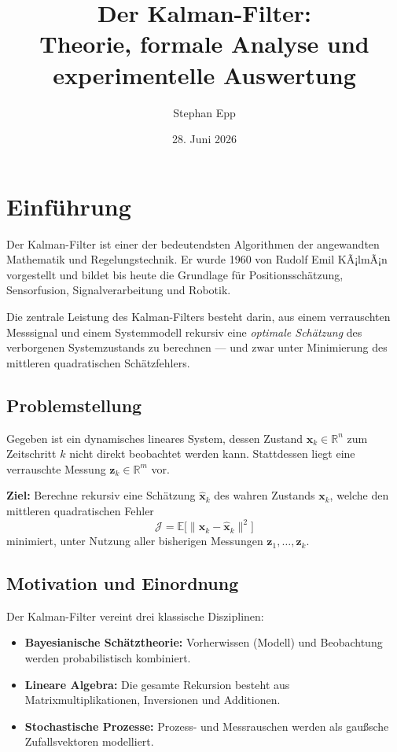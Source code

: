 ﻿\documentclass[a4paper,12pt]{article}
\title{Der Kalman-Filter:\\
\large Theorie, formale Analyse und experimentelle Auswertung}
\author{Stephan Epp}
\date{28. Juni 2026}
\theoremstyle{definition}
\begin{document}
\maketitle

\tableofcontents
\newpage

\section{Einführung}

Der Kalman-Filter ist einer der bedeutendsten Algorithmen der angewandten Mathematik und Regelungstechnik.
Er wurde 1960 von Rudolf Emil KÃ¡lmÃ¡n vorgestellt \cite{kalman1960} und bildet bis heute die
Grundlage für Positionsschätzung, Sensorfusion, Signalverarbeitung und Robotik.

Die zentrale Leistung des Kalman-Filters besteht darin, aus einem verrauschten Messsignal
und einem Systemmodell rekursiv eine \emph{optimale Schätzung} des verborgenen Systemzustands zu
berechnen --- und zwar unter Minimierung des mittleren quadratischen Schätzfehlers.

\subsection{Problemstellung}

Gegeben ist ein dynamisches lineares System, dessen Zustand $\mathbf{x}_k \in \mathbb{R}^n$ zum
Zeitschritt $k$ nicht direkt beobachtet werden kann. Stattdessen liegt eine
verrauschte Messung $\mathbf{z}_k \in \mathbb{R}^m$ vor.

\textbf{Ziel:} Berechne rekursiv eine Schätzung $\hat{\mathbf{x}}_k$ des wahren Zustands
$\mathbf{x}_k$, welche den mittleren quadratischen Fehler
\[
    \mathcal{J} = \mathbb{E}\bigl[\|\mathbf{x}_k - \hat{\mathbf{x}}_k\|^2\bigr]
\]
minimiert, unter Nutzung aller bisherigen Messungen $\mathbf{z}_1, \ldots, \mathbf{z}_k$.

\subsection{Motivation und Einordnung}

Der Kalman-Filter vereint drei klassische Disziplinen:
\begin{itemize}
    \item \textbf{Bayesianische Schätztheorie:} Vorherwissen (Modell) und Beobachtung
          werden probabilistisch kombiniert.
    \item \textbf{Lineare Algebra:} Die gesamte Rekursion besteht aus Matrix\-multiplikationen,
          Inversionen und Additionen.
    \item \textbf{Stochastische Prozesse:} Prozess- und Messrauschen werden als
          gaußsche Zufallsvektoren modelliert.
\end{itemize}
\end{document}
